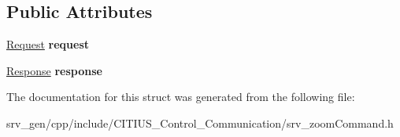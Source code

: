 \subsection*{\-Public \-Attributes}
\begin{DoxyCompactItemize}
\item 
\hypertarget{struct_c_i_t_i_u_s___control___communication_1_1srv__zoom_command_a8b1c2c530832353275beafc07f4a86e2}{\hyperlink{struct_c_i_t_i_u_s___control___communication_1_1srv__zoom_command_request__}{\-Request} {\bfseries request}}\label{struct_c_i_t_i_u_s___control___communication_1_1srv__zoom_command_a8b1c2c530832353275beafc07f4a86e2}

\item 
\hypertarget{struct_c_i_t_i_u_s___control___communication_1_1srv__zoom_command_a46e76aea2bd5698b7820273b5397ccb8}{\hyperlink{struct_c_i_t_i_u_s___control___communication_1_1srv__zoom_command_response__}{\-Response} {\bfseries response}}\label{struct_c_i_t_i_u_s___control___communication_1_1srv__zoom_command_a46e76aea2bd5698b7820273b5397ccb8}

\end{DoxyCompactItemize}


\-The documentation for this struct was generated from the following file\-:\begin{DoxyCompactItemize}
\item 
srv\-\_\-gen/cpp/include/\-C\-I\-T\-I\-U\-S\-\_\-\-Control\-\_\-\-Communication/srv\-\_\-zoom\-Command.\-h\end{DoxyCompactItemize}

